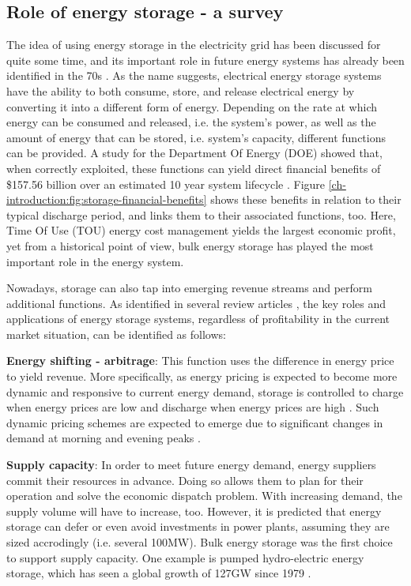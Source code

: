 \subsection{Role of energy storage - a survey}
\label{ch-introduction:subsec:role-of-energy-storage-a-survey}




The idea of using energy storage in the electricity grid has been discussed for quite some time, and its important role in future energy systems has already been identified in the 70s \cite{Kalhammer1979}.
As the name suggests, electrical energy storage systems have the ability to both consume, store, and release electrical energy by converting it into a different form of energy.
Depending on the rate at which energy can be consumed and released, i.e. the system's power, as well as the amount of energy that can be stored, i.e. system's capacity, different functions can be provided.
A study for the Department Of Energy (DOE) showed that, when correctly exploited, these functions can yield direct financial benefits of \$157.56 billion over an estimated 10 year system lifecycle \cite{Eyer2010a}.
Figure \ref{ch-introduction:fig:storage-financial-benefits} shows these benefits in relation to their typical discharge period, and links them to their associated functions, too.
Here, Time Of Use (TOU) energy cost management yields the largest economic profit, yet from a historical point of view, bulk energy storage has played the most important role in the energy system.

Nowadays, storage can also tap into emerging revenue streams and perform additional functions.
As identified in several review articles \cite{Chen2009, Katsanevakis2017, Guney2017}, the key roles and applications of energy storage systems, regardless of profitability in the current market situation, can be identified as follows:

\textbf{Energy shifting - arbitrage}: This function uses the difference in energy price to yield revenue.
More specifically, as energy pricing is expected to become more dynamic and responsive to current energy demand, storage is controlled to charge when energy prices are low and discharge when energy prices are high \cite{Chen2009, Leou2012}.
Such dynamic pricing schemes are expected to emerge due to significant changes in demand at morning and evening peaks \cite{Koohi-Kamali2013}.

\textbf{Supply capacity}: In order to meet future energy demand, energy suppliers commit their resources in advance.
Doing so allows them to plan for their operation and solve the economic dispatch problem.
With increasing demand, the supply volume will have to increase, too.
However, it is predicted that energy storage can defer or even avoid investments in power plants, assuming they are sized accrodingly (i.e. several 100MW)\cite{Dobie1998}.
Bulk energy storage was the first choice to support supply capacity.
One example is pumped hydro-electric energy storage, which has seen a global growth of 127GW since 1979 \cite{Rehman2015, Barbour2015, Barbour2016}.

